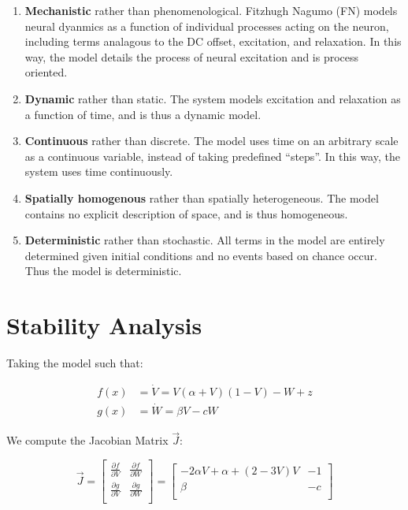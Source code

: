 \documentclass[11pt]{report}
\begin{document}
\begin{enumerate}
	\item \textbf{Mechanistic} rather than phenomenological. Fitzhugh Nagumo (FN) models neural dyanmics as a function of individual processes acting on the neuron, including terms analagous to the DC offset, excitation, and relaxation. In this way, the model details the process of neural excitation and is process oriented.
	\item \textbf{Dynamic} rather than static. The system models excitation and relaxation as a function of time, and is thus a dynamic model.
	\item \textbf{Continuous} rather than discrete. The model uses time on an arbitrary scale as a continuous variable, instead of taking predefined ``steps''. In this way, the system uses time continuously. 
	\item \textbf{Spatially homogenous} rather than spatially heterogeneous. The model contains no explicit description of space, and is thus homogeneous. 
	\item \textbf{Deterministic} rather than stochastic. All terms in the model are entirely determined given initial conditions and no events based on chance occur. Thus the model is deterministic. 
\end{enumerate}

\section{Stability Analysis} %
\label{sub:stability_analysis}

Taking the model such that:

$$\begin{aligned}
f(x) &= \dot{V} = V(\alpha + V)(1-V) -W +z \\
g(x) &= \dot{W} = \beta V -cW
\end{aligned}
$$

We compute the Jacobian Matrix $\vec{J}$:


$$
\vec{J} = \begin{bmatrix}
    \frac{\partial f}{\partial{V}} & \frac{\partial f}{\partial{W}} \\
    \frac{\partial g}{\partial{V}} & \frac{\partial g}{\partial{W}} \\
\end{bmatrix} = 
\begin{bmatrix}
    −2\alpha V+\alpha+(2 - 3V)V & -1 \\
    \beta & -c \\
\end{bmatrix}
$$
\end{document}
